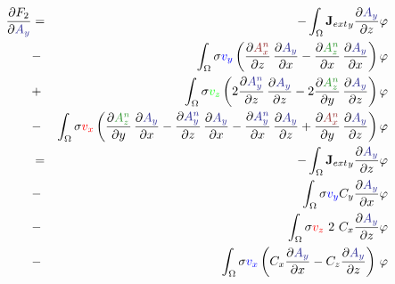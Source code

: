 \documentclass[smallextended]{svjour3}       %
\begin{document}
			\begin{eqnarray}
			\frac{\partial F_2}{\partial \textcolor{darkblu}{A_y}} & = &
			-\int_{\Omega} {\mathbf{J}_{ext}}_y \frac{\partial \textcolor{darkblu}{A_y}}{\partial z} \varphi				
			\nonumber \\
			& - &\int_{\Omega} \sigma \textcolor{blu}{v_y} \left(
			\frac{\partial \textcolor{darkred}{A_x^n}}{\partial z}\,\frac{\partial \textcolor{darkblu}{A_y}}{\partial x}
			- \frac{\partial \textcolor{darkgre}{A_z^n}}{\partial x}\,\frac{\partial \textcolor{darkblu}{A_y}}{\partial x}
				\right) \varphi \nonumber \\		
			& + &\int_{\Omega} \sigma \textcolor{gre}{v_z} \left(
			2 \frac{\partial \textcolor{darkblu}{A_y^n}}{\partial z}\,\frac{\partial \textcolor{darkblu}{A_y}}{\partial z}
			- 2 \frac{\partial \textcolor{darkgre}{A_z^n}}{\partial y}\,\frac{\partial \textcolor{darkblu}{A_y}}{\partial z}\right) \varphi \nonumber \\			
			& - &\int_{\Omega} \sigma \textcolor{red}{v_x} \left(
			\frac{\partial \textcolor{darkgre}{A_z^n}}{\partial y}\,\frac{\partial \textcolor{darkblu}{A_y}}{\partial x}
			- \frac{\partial \textcolor{darkblu}{A_y^n}}{\partial z}\,\frac{\partial \textcolor{darkblu}{A_y}}{\partial x}
			- \frac{\partial \textcolor{darkblu}{A_y^n}}{\partial x}\,\frac{\partial \textcolor{darkblu}{A_y}}{\partial z}
			+ \frac{\partial \textcolor{darkred}{A_x^n}}{\partial y}\,\frac{\partial \textcolor{darkblu}{A_y}}{\partial z}
				\right) \varphi \nonumber \\		
			 & = &
			-\int_{\Omega} {\mathbf{J}_{ext}}_y \frac{\partial \textcolor{darkblu}{A_y}}{\partial z} \varphi				
			\nonumber \\
			& - &\int_{\Omega} \sigma  \textcolor{blu}{v_y}    C_y \frac{\partial \textcolor{darkblu}{A_y}}{\partial x} \varphi \nonumber \\			
			& - &\int_{\Omega} \sigma  \textcolor{red}{v_z} \ 2\ C_x \frac{\partial \textcolor{darkblu}{A_y}}{\partial z} \varphi \nonumber \\			
			& - & \int_{\Omega} \sigma \textcolor{blu}{v_x} \left( C_x \frac{\partial \textcolor{darkblu}{A_y}}{\partial x} - C_z \frac{\partial \textcolor{darkblu}{A_y}}{\partial z}\right)\,\varphi
					\end{eqnarray}
					
\end{document}
